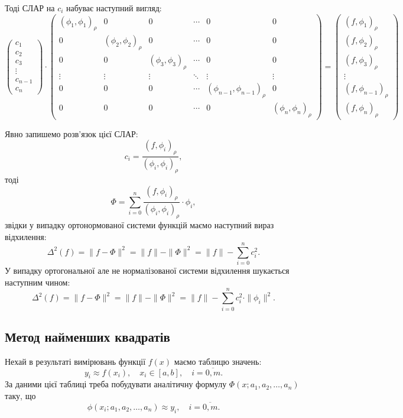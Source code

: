 Тоді СЛАР на $c_i$ набуває наступний вигляд:
\[ \begin{pmatrix} c_1 \\ c_2 \\ c_3 \\ \vdots \\ c_{n - 1} \\ c_n \end{pmatrix} \cdot \begin{pmatrix} (\phi_1, \phi_1)_\rho & 0 & 0 & \cdots & 0 & 0 \\ 0 & (\phi_2, \phi_2)_\rho & 0 & \cdots & 0 & 0 \\ 0 & 0 & (\phi_3, \phi_3)_\rho & \cdots & 0 & 0 \\ \vdots & \vdots & \vdots & \ddots & \vdots & \vdots \\ 0 & 0 & 0 & \cdots & (\phi_{n - 1}, \phi_{n - 1})_\rho & 0 \\ 0 & 0 & 0 & \cdots & 0 & (\phi_n, \phi_n)_\rho \end{pmatrix} = \begin{pmatrix} (f, \phi_1)_\rho \\ (f, \phi_2)_\rho \\ (f, \phi_3)_\rho \\ \vdots \\ (f, \phi_{n - 1})_\rho \\ (f, \phi_n)_\rho \end{pmatrix} \]

Явно запишемо розв'язок цієї СЛАР: \[ c_i = \frac{(f, \phi_i)_\rho}{(\phi_i, \phi_i)_\rho}, \] тоді \[ \Phi = \sum_{i = 0}^n \frac{(f, \phi_i)_\rho}{(\phi_i, \phi_i)_\rho} \cdot \phi_i, \] звідки у випадку ортонормованої системи функцій маємо наступний вираз відхилення: \[ \Delta^2(f) = \|f - \Phi\|^2 = \|f\| - \|\Phi\|^2 = \|f\| - \sum_{i=0}^n c_i^2.\] У випадку ортогональної але не нормалізованої системи відхилення шукається наступним чином: \begin{equation} \label{delta} \Delta^2(f) = \|f - \Phi\|^2 = \|f\| - \|\Phi\|^2 = \|f\| - \sum_{i=0}^n c_i^2 \cdot \|\phi_i\|^2. \end{equation}

\subsection{Метод найменших квадратів}

Нехай в результаті вимірювань функції $f(x)$ маємо таблицю значень: \[ y_i \approx f(x_i), \quad x_i \in [a, b], \quad i = \overline{0, m}.\] За даними цієї таблиці треба побудувати аналітичну формулу $\Phi(x; a_1, a_2, \ldots, a_n)$ таку, що \[ \phi(x_i; a_1, a_2, \ldots, a_n) \approx y_i, \quad i = \overline{0, m}.\] 

